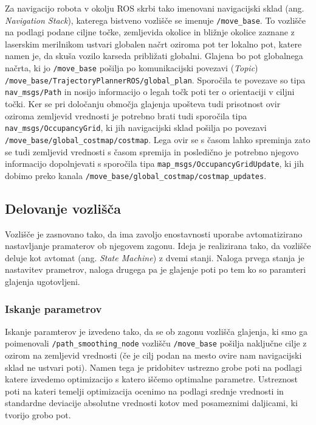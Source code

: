 Za navigacijo robota v okolju ROS skrbi tako imenovani navigacijski sklad (ang. \textit{Navigation Stack}), katerega bistveno vozlišče se imenuje \texttt{/move\_base}. To vozlišče na podlagi podane ciljne točke, zemljevida okolice in bližnje okolice zaznane z laserskim merilnikom ustvari globalen načrt oziroma pot ter lokalno pot, katere namen je, da skuša vozilo karseda približati globalni. Glajena bo pot globalnega načrta, ki jo \texttt{/move\_base} pošilja po komunikacijski povezavi (\textit{Topic}) \texttt{/move\_base/TrajectoryPlannerROS/global\_plan}. \newline Sporočila te povezave so tipa \texttt{nav\_msgs/Path} in nosijo informacijo o legah točk poti ter o orientaciji v ciljni točki. Ker se pri določanju območja glajenja upošteva tudi prisotnost ovir oziroma zemljevid vrednosti je potrebno brati tudi sporočila tipa \newline \texttt{nav\_msgs/OccupancyGrid}, ki jih navigacijski sklad pošilja po povezavi \newline \texttt{/move\_base/global\_costmap/costmap}. Lega ovir se s časom lahko spreminja zato se tudi zemljevid vrednosti s časom spremija in posledično je potrebno njegovo informacijo dopolnjevati s sporočila tipa \texttt{map\_msgs/OccupancyGridUpdate}, ki jih dobimo preko kanala
\texttt{/move\_base/global\_costmap/costmap\_updates}.

\subsection{Delovanje vozlišča}

Vozlišče je zasnovano tako, da ima zavoljo enostavnosti uporabe avtomatizirano nastavljanje pramaterov ob njegovem zagonu. Ideja je realizirana tako, da vozlišče deluje kot avtomat (ang. \textit{State Machine}) z dvemi stanji. Naloga prvega stanja je nastavitev prametrov, naloga drugega pa je glajenje poti po tem ko so paramteri glajenja ugotovljeni.

\subsubsection{Iskanje parametrov}

Iskanje paramterov je izvedeno tako, da se ob zagonu vozlišča glajenja, ki smo ga poimenovali \texttt{/path\_smoothing\_node} vozlišču \texttt{/move\_base} pošilja naključne cilje z ozirom na zemljevid vrednosti (če je cilj podan na mesto ovire nam navigacijski sklad ne ustvari poti). Namen tega je pridobitev ustrezno grobe poti na podlagi katere izvedemo optimizacijo s katero iščemo optimalne parametre. Ustreznost poti na kateri temelji optimizacija ocenimo na podlagi srednje vrednosti in standardne deviacije absolutne vrednosti kotov med posameznimi daljicami, ki tvorijo grobo pot.


